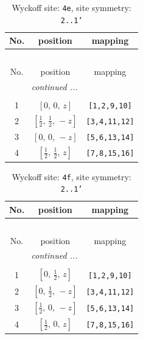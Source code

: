 \documentclass[fleqn,8pt]{jsarticle}
\begin{document}
\begin{longtable}{ccc}
\caption{Wyckoff site: {\tt 4e}, site symmetry: {\tt 2..1'}}
 \\
 \hline \hline
No. & position & mapping \\ \hline \endfirsthead

\multicolumn{2}{l}{\tablename\ \thetable{}} \\
 \hline \hline
No. & position & mapping \\ \hline \endhead

 \hline \hline
\multicolumn{2}{r}{\footnotesize\it continued ...} \\ \endfoot

 \hline \hline
\multicolumn{2}{r}{} \\ \endlastfoot

1 & $\left[ 0,\, 0,\, z \right]$ & {\tt [1,2,9,10]} \\ \hline
2 & $\left[ \frac{1}{2},\, \frac{1}{2},\, - z \right]$ & {\tt [3,4,11,12]} \\ \hline
3 & $\left[ 0,\, 0,\, - z \right]$ & {\tt [5,6,13,14]} \\ \hline
4 & $\left[ \frac{1}{2},\, \frac{1}{2},\, z \right]$ & {\tt [7,8,15,16]} \\
\end{longtable}
\renewcommand{\arraystretch}{1.2}
\begin{longtable}{ccc}
\caption{Wyckoff site: {\tt 4f}, site symmetry: {\tt 2..1'}}
 \\
 \hline \hline
No. & position & mapping \\ \hline \endfirsthead

\multicolumn{2}{l}{\tablename\ \thetable{}} \\
 \hline \hline
No. & position & mapping \\ \hline \endhead

 \hline \hline
\multicolumn{2}{r}{\footnotesize\it continued ...} \\ \endfoot

 \hline \hline
\multicolumn{2}{r}{} \\ \endlastfoot

1 & $\left[ 0,\, \frac{1}{2},\, z \right]$ & {\tt [1,2,9,10]} \\ \hline
2 & $\left[ 0,\, \frac{1}{2},\, - z \right]$ & {\tt [3,4,11,12]} \\ \hline
3 & $\left[ \frac{1}{2},\, 0,\, - z \right]$ & {\tt [5,6,13,14]} \\ \hline
4 & $\left[ \frac{1}{2},\, 0,\, z \right]$ & {\tt [7,8,15,16]} \\
\end{longtable}
\end{document}
